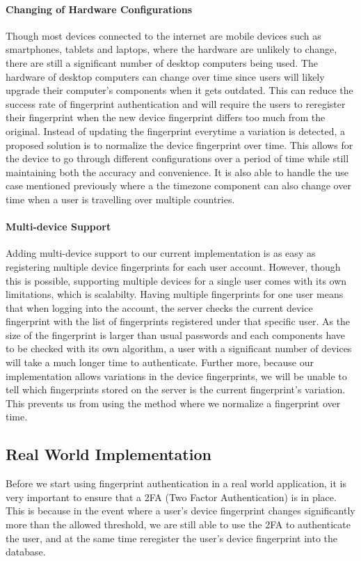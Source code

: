 \documentclass{acm_proc_article-sp}
\begin{document}
\paragraph{Changing of Hardware Configurations}
Though most devices connected to the internet are mobile devices such as smartphones, tablets and laptops, where the hardware are unlikely to change, there are still a significant number of desktop computers being used. The hardware of desktop computers can change over time since users will likely upgrade their computer's components when it gets outdated. This can reduce the success rate of fingerprint authentication and will require the users to reregister their fingerprint when the new device fingerprint differs too much from the original. Instead of updating the fingerprint everytime a variation is detected, a proposed solution is to normalize the device fingerprint over time. This allows for the device to go through different configurations over a period of time while still maintaining both the accuracy and convenience. It is also able to handle the use case mentioned previously where a the timezone component can also change over time when a user is travelling over multiple countries.

\paragraph{Multi-device Support}
Adding multi-device support to our current implementation is as easy as registering multiple device fingerprints for each user account. However, though this is possible, supporting multiple devices for a single user comes with its own limitations, which is scalabilty. Having multiple fingerprints for one user means that when logging into the account, the server checks the current device fingerprint with the list of fingerprints registered under that specific user. As the size of the fingerprint is larger than usual passwords and each components have to be checked with its own algorithm, a user with a significant number of devices will take a much longer time to authenticate. Further more, because our implementation allows variations in the device fingerprints, we will be unable to tell which fingerprints stored on the server is the current fingerprint's variation. This prevents us from using the method where we normalize a fingerprint over time.

\subsection{Real World Implementation}
Before we start using fingerprint authentication in a real world application, it is very important to ensure that a 2FA (Two Factor Authentication) is in place. This is because in the event where a user's device fingerprint changes significantly more than the allowed threshold, we are still able to use the 2FA to authenticate the user, and at the same time reregister the user's device fingerprint into the database.
\end{document}
